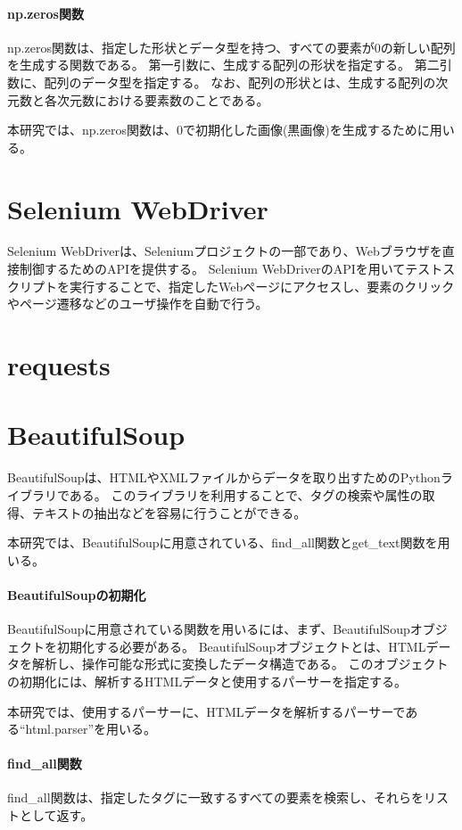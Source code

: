 \paragraph{np.zeros関数}
np.zeros関数は、指定した形状とデータ型を持つ、すべての要素が$0$の新しい配列を生成する関数である。
第一引数に、生成する配列の形状を指定する。
第二引数に、配列のデータ型を指定する。
なお、配列の形状とは、生成する配列の次元数と各次元数における要素数のことである。
\par
本研究では、np.zeros関数\cite{np.zeros}は、$0$で初期化した画像(黒画像)を生成するために用いる。

\section{Selenium WebDriver}\label{sec:Selenium_WebDriver}
Selenium WebDriver\cite{SeleniumWebDriver}は、Seleniumプロジェクト\cite{Selenium}の一部であり、Webブラウザを直接制御するためのAPIを提供する。
Selenium WebDriverのAPIを用いてテストスクリプトを実行することで、指定したWebページにアクセスし、要素のクリックやページ遷移などのユーザ操作を自動で行う。

\section{requests}\label{sec:requests}

\section{BeautifulSoup}\label{sec:beautifulsoup}
BeautifulSoup\cite{BeautifulSoup}は、HTMLやXMLファイルからデータを取り出すためのPythonライブラリである。
このライブラリを利用することで、タグの検索や属性の取得、テキストの抽出などを容易に行うことができる。
\par
本研究では、BeautifulSoupに用意されている、find\_all関数とget\_text関数を用いる。
\paragraph{BeautifulSoupの初期化}
BeautifulSoupに用意されている関数を用いるには、まず、BeautifulSoupオブジェクトを初期化する必要がある。
BeautifulSoupオブジェクトとは、HTMLデータを解析し、操作可能な形式に変換したデータ構造である。
このオブジェクトの初期化には、解析するHTMLデータと使用するパーサーを指定する。
\par
本研究では、使用するパーサーに、HTMLデータを解析するパーサーである“html.parser”\cite{BeautifulSoup}を用いる。
\paragraph{find\_all関数}
find\_all関数は、指定したタグに一致するすべての要素を検索し、それらをリストとして返す。
